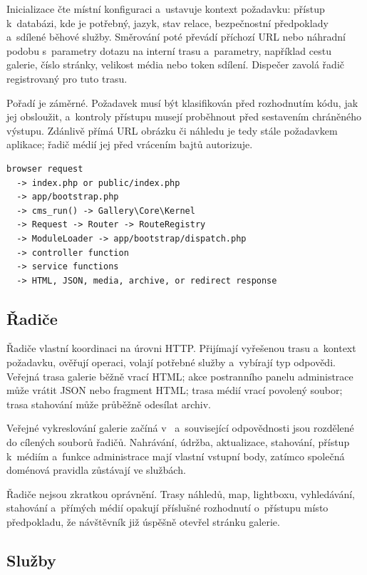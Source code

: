 \documentclass[11pt,a4paper]{article}
\newcommand{\filepath}[1]{\path{#1}}
\begin{document}
Inicializace čte místní konfiguraci a~ustavuje kontext požadavku: přístup
k~databázi, kde je potřebný, jazyk, stav relace, bezpečnostní předpoklady
a~sdílené běhové služby. Směrování poté převádí příchozí URL nebo náhradní
podobu s~parametry dotazu na interní trasu a~parametry, například cestu galerie,
číslo stránky, velikost média nebo token sdílení. Dispečer zavolá řadič
registrovaný pro tuto trasu.

Pořadí je záměrné. Požadavek musí být klasifikován před rozhodnutím kódu, jak
jej obsloužit, a~kontroly přístupu musejí proběhnout před sestavením chráněného
výstupu. Zdánlivě přímá URL obrázku či náhledu je tedy stále požadavkem
aplikace; řadič médií jej před vrácením bajtů autorizuje.

\begin{lstlisting}
browser request
  -> index.php or public/index.php
  -> app/bootstrap.php
  -> cms_run() -> Gallery\Core\Kernel
  -> Request -> Router -> RouteRegistry
  -> ModuleLoader -> app/bootstrap/dispatch.php
  -> controller function
  -> service functions
  -> HTML, JSON, media, archive, or redirect response
\end{lstlisting}

\subsection{Řadiče}

Řadiče vlastní koordinaci na úrovni HTTP. Přijímají vyřešenou trasu a~kontext
požadavku, ověřují operaci, volají potřebné služby a~vybírají typ odpovědi.
Veřejná trasa galerie běžně vrací HTML; akce postranního panelu administrace
může vrátit JSON nebo fragment HTML; trasa médií vrací povolený soubor; trasa
stahování může průběžně odesílat archiv.

Veřejné vykreslování galerie začíná
v~\filepath{app/controllers/public_gallery.php} a~související odpovědnosti jsou
rozdělené do cílených souborů řadičů. Nahrávání, údržba, aktualizace, stahování,
přístup k~médiím a~funkce administrace mají vlastní vstupní body, zatímco
společná doménová pravidla zůstávají ve službách.

Řadiče nejsou zkratkou oprávnění. Trasy náhledů, map, lightboxu, vyhledávání,
stahování a~přímých médií opakují příslušné rozhodnutí o~přístupu místo
předpokladu, že návštěvník již úspěšně otevřel stránku galerie.

\subsection{Služby}
\end{document}
